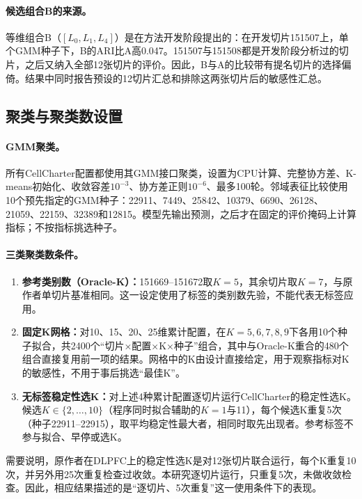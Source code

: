 \paragraph{候选组合B的来源。}等维组合B（$[L_0,L_1,L_4]$）是在方法开发阶段提出的：在开发切片151507上，单个GMM种子下，B的ARI比A高0.047。151507与151508都是开发阶段分析过的切片，之后又纳入全部12张切片的评价。因此，B与A的比较带有提名切片的选择偏倚。结果中同时报告预设的12切片汇总和排除这两张切片后的敏感性汇总。

\subsection{聚类与聚类数设置}
\label{subsec:cc-clustering-p1}
\paragraph{GMM聚类。}所有CellCharter配置都使用其GMM接口聚类，设置为CPU计算、完整协方差、K-means初始化、收敛容差$10^{-3}$、协方差正则$10^{-6}$、最多100轮。邻域表征比较使用10个预先指定的GMM种子：22911、7449、25842、10379、6690、26128、21059、22159、32389和12815。模型先输出预测，之后才在固定的评价掩码上计算指标；不按指标挑选种子。

\paragraph{三类聚类数条件。}
\begin{enumerate}
  \item \textbf{参考类别数（Oracle-K）：}151669--151672取$K=5$，其余切片取$K=7$，与原作者单切片基准相同。这一设定使用了标签的类别数先验，不能代表无标签应用。
  \item \textbf{固定K网格：}对10、15、20、25维累计配置，在$K=5,6,7,8,9$下各用10个种子拟合，共2400个“切片×配置×K×种子”组合，其中与Oracle-K重合的480个组合直接复用前一项的结果。网格中的K由设计直接给定，用于观察指标对K的敏感性，不用于事后挑选“最佳K”。
  \item \textbf{无标签稳定性选K：}对上述4种累计配置逐切片运行CellCharter的稳定性选K。候选$K\in\{2,\ldots,10\}$（程序同时拟合辅助的$K=1$与11），每个候选K重复5次（种子22911--22915），取平均稳定性最大者，相同时取先出现者。参考标签不参与拟合、早停或选K。
\end{enumerate}
需要说明，原作者在DLPFC上的稳定性选K是对12张切片联合运行，每个K重复10次，并另外用25次重复检查过收敛\cite{varrone2024}。本研究逐切片运行，只重复5次，未做收敛检查。因此，相应结果描述的是“逐切片、5次重复”这一使用条件下的表现。

